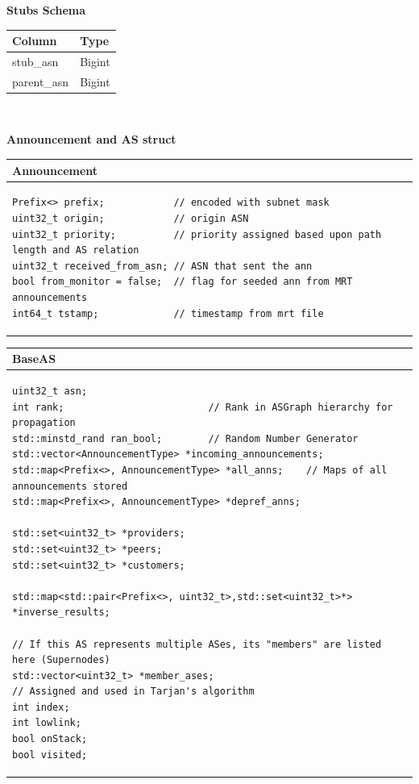 \documentclass[letterpaper]{article}
\begin{document}
\textbf{Stubs Schema}

\begin{longtable}[]{@{}l|l@{}}
\toprule
\textbf{Column} & \textbf{Type}\tabularnewline
\endhead
\midrule
stub\_asn & Bigint\tabularnewline
parent\_asn & Bigint\tabularnewline
\bottomrule
\end{longtable}

\textbf{\\
}

\textbf{Announcement and AS struct}

\begin{longtable}[]{@{}l@{}}
\toprule
\textbf{Announcement}\tabularnewline
\midrule
\endhead
\begin{minipage}[t]{0.97\columnwidth}\raggedright
\begin{verbatim}
Prefix<> prefix;            // encoded with subnet mask
uint32_t origin;            // origin ASN
uint32_t priority;          // priority assigned based upon path length and AS relation
uint32_t received_from_asn; // ASN that sent the ann
bool from_monitor = false;  // flag for seeded ann from MRT announcements
int64_t tstamp;             // timestamp from mrt file

\end{verbatim}
\end{minipage}\tabularnewline
\bottomrule
\end{longtable}

\begin{longtable}[]{@{}l@{}}
\toprule
\textbf{BaseAS}\tabularnewline
\midrule
\endhead
\begin{minipage}[t]{0.97\columnwidth}\raggedright
\begin{verbatim}
uint32_t asn;     
int rank;                         // Rank in ASGraph hierarchy for propagation 
std::minstd_rand ran_bool;        // Random Number Generator
std::vector<AnnouncementType> *incoming_announcements;
std::map<Prefix<>, AnnouncementType> *all_anns;    // Maps of all announcements stored
std::map<Prefix<>, AnnouncementType> *depref_anns;

std::set<uint32_t> *providers; 
std::set<uint32_t> *peers; 
std::set<uint32_t> *customers; 

std::map<std::pair<Prefix<>, uint32_t>,std::set<uint32_t>*> *inverse_results; 

// If this AS represents multiple ASes, its "members" are listed here (Supernodes)  
std::vector<uint32_t> *member_ases;
// Assigned and used in Tarjan's algorithm
int index;
int lowlink;
bool onStack;
bool visited;      
\end{verbatim}
\strut
\end{minipage}\tabularnewline
\bottomrule
\end{longtable}

\nocite{*}

\end{document}
